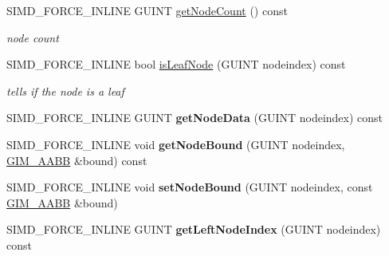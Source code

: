 \begin{DoxyCompactItemize}
\mbox{\label{classGIM__BOX__TREE__TEMPLATE__SET_a3c7ceb8815be89e7b54c3f0bdd0ff571}} 
S\+I\+M\+D\+\_\+\+F\+O\+R\+C\+E\+\_\+\+I\+N\+L\+I\+NE G\+U\+I\+NT \hyperlink{classGIM__BOX__TREE__TEMPLATE__SET_a3c7ceb8815be89e7b54c3f0bdd0ff571}{get\+Node\+Count} () const
\begin{DoxyCompactList}\small\item\em node count \end{DoxyCompactList}\item 
\mbox{\label{classGIM__BOX__TREE__TEMPLATE__SET_a2388f9b52409031c7c1eb8144466ccda}} 
S\+I\+M\+D\+\_\+\+F\+O\+R\+C\+E\+\_\+\+I\+N\+L\+I\+NE bool \hyperlink{classGIM__BOX__TREE__TEMPLATE__SET_a2388f9b52409031c7c1eb8144466ccda}{is\+Leaf\+Node} (G\+U\+I\+NT nodeindex) const
\begin{DoxyCompactList}\small\item\em tells if the node is a leaf \end{DoxyCompactList}\item 
\mbox{\label{classGIM__BOX__TREE__TEMPLATE__SET_ab0a92a8b6147367f76cb9ebe33fd4786}} 
S\+I\+M\+D\+\_\+\+F\+O\+R\+C\+E\+\_\+\+I\+N\+L\+I\+NE G\+U\+I\+NT {\bfseries get\+Node\+Data} (G\+U\+I\+NT nodeindex) const
\item 
\mbox{\label{classGIM__BOX__TREE__TEMPLATE__SET_aaeb802d091fd576c528d8cb74a783f47}} 
S\+I\+M\+D\+\_\+\+F\+O\+R\+C\+E\+\_\+\+I\+N\+L\+I\+NE void {\bfseries get\+Node\+Bound} (G\+U\+I\+NT nodeindex, \hyperlink{classGIM__AABB}{G\+I\+M\+\_\+\+A\+A\+BB} \&bound) const
\item 
\mbox{\label{classGIM__BOX__TREE__TEMPLATE__SET_aeb9993cf71068d07c9b12dae5157c76c}} 
S\+I\+M\+D\+\_\+\+F\+O\+R\+C\+E\+\_\+\+I\+N\+L\+I\+NE void {\bfseries set\+Node\+Bound} (G\+U\+I\+NT nodeindex, const \hyperlink{classGIM__AABB}{G\+I\+M\+\_\+\+A\+A\+BB} \&bound)
\item 
\mbox{\label{classGIM__BOX__TREE__TEMPLATE__SET_a74b8b97e7447050abf7ce6a52af9fffb}} 
S\+I\+M\+D\+\_\+\+F\+O\+R\+C\+E\+\_\+\+I\+N\+L\+I\+NE G\+U\+I\+NT {\bfseries get\+Left\+Node\+Index} (G\+U\+I\+NT nodeindex) const

\end{DoxyCompactItemize}
